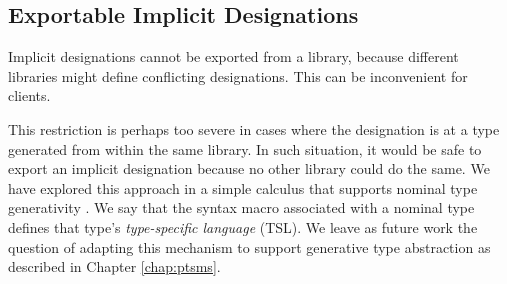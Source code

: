 

\subsection{Exportable Implicit Designations}
Implicit designations cannot be exported from a library, because different libraries might define conflicting designations. This can be inconvenient for clients.

This restriction is perhaps too severe in cases where the designation is at a type generated from within the same library. In such situation, it would be safe to export an implicit designation because no other library could do the same. We have explored this approach in a simple calculus that supports nominal type generativity \cite{TSLs}. We say that the syntax macro associated with a nominal type defines that type's \emph{type-specific language} (TSL). We leave as future work the question of adapting this mechanism to support generative type abstraction as described in Chapter \ref{chap:ptsms}. 


